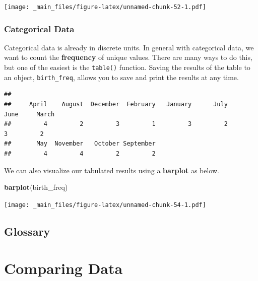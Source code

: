 \documentclass[
]{book}
\newenvironment{Shaded}{\begin{snugshade}}{\end{snugshade}}
\newcommand{\FunctionTok}[1]{\textcolor[rgb]{0.13,0.29,0.53}{\textbf{#1}}}
\newcommand{\NormalTok}[1]{#1}
\newcommand{\OtherTok}[1]{\textcolor[rgb]{0.56,0.35,0.01}{#1}}
\newcommand{\SpecialCharTok}[1]{\textcolor[rgb]{0.81,0.36,0.00}{\textbf{#1}}}
\begin{document}
\texttt{[image: \_main\_files/figure-latex/unnamed-chunk-52-1.pdf]}

\hypertarget{categorical-data}{%
\subsection{Categorical Data}\label{categorical-data}}

Categorical data is already in discrete units. In general with categorical data, we want to count the \textbf{frequency} of unique values. There are many ways to do this, but one of the easiest is the \texttt{table()} function. Saving the results of the table to an object, \texttt{birth\_freq}, allows you to save and print the results at any time.

\begin{Shaded}
\end{Shaded}

\begin{verbatim}
## 
##     April    August  December  February   January      July      June     March 
##         4         2         3         1         3         2         3         2 
##       May  November   October September 
##         4         4         2         2
\end{verbatim}

We can also visualize our tabulated results using a \textbf{barplot} as below.

\begin{Shaded}
\begin{Highlighting}[]
\FunctionTok{barplot}\NormalTok{(birth\_freq)}
\end{Highlighting}
\end{Shaded}

\texttt{[image: \_main\_files/figure-latex/unnamed-chunk-54-1.pdf]}

\hypertarget{glossary-2}{%
\section*{Glossary}\label{glossary-2}}

\hypertarget{comparing-data}{%
\chapter{Comparing Data}\label{comparing-data}}
\end{document}
